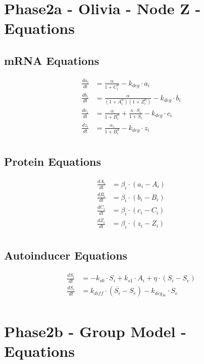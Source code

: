 \documentclass[fleqn]{article}
\begin{document}
\pagebreak

\section*{Phase2a - Olivia - Node Z - Equations}

\subsection*{mRNA Equations}
\begin{align*}
\frac{da_i}{dt} &= \frac{\alpha}{1 + C_i^n} - k_{deg} \cdot a_i \\
\frac{db_i}{dt} &= \frac{\alpha}{(1 + A_i^n)(1 + Z_i^n)} - k_{deg} \cdot b_i \\
\frac{dc_i}{dt} &= \frac{\alpha}{1 + B_i^n} + \frac{\kappa \cdot S_i}{1 + S_i} - k_{deg} \cdot c_i \\
\frac{dz_i}{dt} &= \frac{\alpha_z}{1 + B_i^n} - k_{deg} \cdot z_i \\
\end{align*}

\subsection*{Protein Equations}
\begin{align*}
\frac{dA_i}{dt} &= \beta_i \cdot (a_i - A_i) \\
\frac{dB_i}{dt} &= \beta_i \cdot (b_i - B_i) \\
\frac{dC_i}{dt} &= \beta_i \cdot (c_i - C_i) \\
\frac{dZ_i}{dt} &= \beta_i \cdot (z_i - Z_i) \\
\end{align*}

\subsection*{Autoinducer Equations}
\begin{align*}
\frac{dS_i}{dt} &= -k_{s0} \cdot S_i + k_{s1} \cdot A_i + \eta \cdot (S_i - S_e) \\
\frac{dS_e}{dt} &= k_{diff} \cdot (\overline{S_i} - S_e) - k_{deg_{Se}} \cdot S_e \\
\end{align*}

\pagebreak

\section*{Phase2b - Group Model - Equations}
\end{document}

